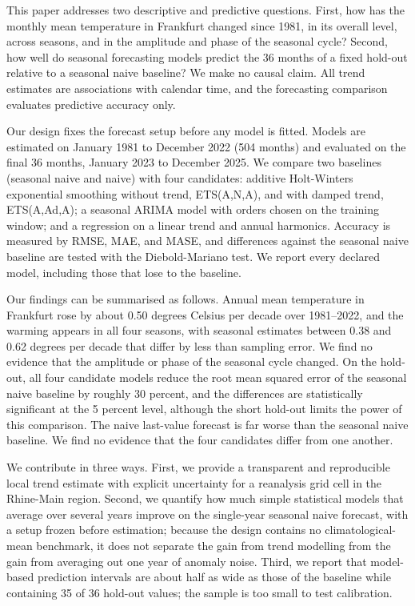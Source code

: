 \documentclass[11pt]{article}
\begin{document}
This paper addresses two descriptive and predictive questions. First, how has the monthly mean temperature in Frankfurt changed since 1981, in its overall level, across seasons, and in the amplitude and phase of the seasonal cycle? Second, how well do seasonal forecasting models predict the 36 months of a fixed hold-out relative to a seasonal naive baseline? We make no causal claim. All trend estimates are associations with calendar time, and the forecasting comparison evaluates predictive accuracy only.

Our design fixes the forecast setup before any model is fitted. Models are estimated on January 1981 to December 2022 (504 months) and evaluated on the final 36 months, January 2023 to December 2025. We compare two baselines (seasonal naive and naive) with four candidates: additive Holt-Winters exponential smoothing without trend, ETS(A,N,A), and with damped trend, ETS(A,Ad,A); a seasonal ARIMA model with orders chosen on the training window; and a regression on a linear trend and annual harmonics. Accuracy is measured by RMSE, MAE, and MASE, and differences against the seasonal naive baseline are tested with the Diebold-Mariano test. We report every declared model, including those that lose to the baseline.

Our findings can be summarised as follows. Annual mean temperature in Frankfurt rose by about 0.50 degrees Celsius per decade over 1981--2022, and the warming appears in all four seasons, with seasonal estimates between 0.38 and 0.62 degrees per decade that differ by less than sampling error. We find no evidence that the amplitude or phase of the seasonal cycle changed. On the hold-out, all four candidate models reduce the root mean squared error of the seasonal naive baseline by roughly 30 percent, and the differences are statistically significant at the 5 percent level, although the short hold-out limits the power of this comparison. The naive last-value forecast is far worse than the seasonal naive baseline. We find no evidence that the four candidates differ from one another.

We contribute in three ways. First, we provide a transparent and reproducible local trend estimate with explicit uncertainty for a reanalysis grid cell in the Rhine-Main region. Second, we quantify how much simple statistical models that average over several years improve on the single-year seasonal naive forecast, with a setup frozen before estimation; because the design contains no climatological-mean benchmark, it does not separate the gain from trend modelling from the gain from averaging out one year of anomaly noise. Third, we report that model-based prediction intervals are about half as wide as those of the baseline while containing 35 of 36 hold-out values; the sample is too small to test calibration.
\end{document}
